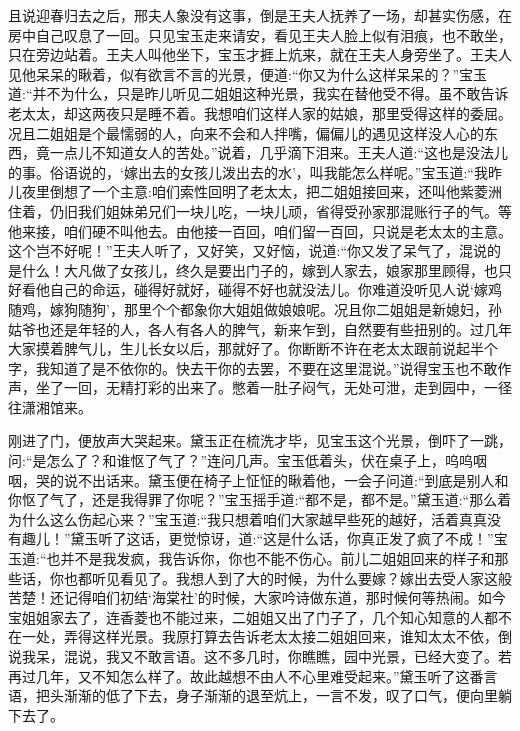 


\begin{parag}
    且说迎春归去之后，邢夫人象没有这事，倒是王夫人抚养了一场，却甚实伤感，在房中自己叹息了一回。只见宝玉走来请安，看见王夫人脸上似有泪痕，也不敢坐，只在旁边站着。王夫人叫他坐下，宝玉才捱上炕来，就在王夫人身旁坐了。王夫人见他呆呆的瞅着，似有欲言不言的光景，便道:“你又为什么这样呆呆的？”宝玉道:“并不为什么，只是昨儿听见二姐姐这种光景，我实在替他受不得。虽不敢告诉老太太，却这两夜只是睡不着。我想咱们这样人家的姑娘，那里受得这样的委屈。况且二姐姐是个最懦弱的人，向来不会和人拌嘴，偏偏儿的遇见这样没人心的东西，竟一点儿不知道女人的苦处。”说着，几乎滴下泪来。王夫人道:“这也是没法儿的事。俗语说的，‘嫁出去的女孩儿泼出去的水’，叫我能怎么样呢。”宝玉道:“我昨儿夜里倒想了一个主意:咱们索性回明了老太太，把二姐姐接回来，还叫他紫菱洲住着，仍旧我们姐妹弟兄们一块儿吃，一块儿顽，省得受孙家那混账行子的气。等他来接，咱们硬不叫他去。由他接一百回，咱们留一百回，只说是老太太的主意。这个岂不好呢！”王夫人听了，又好笑，又好恼，说道:“你又发了呆气了，混说的是什么！大凡做了女孩儿，终久是要出门子的，嫁到人家去，娘家那里顾得，也只好看他自己的命运，碰得好就好，碰得不好也就没法儿。你难道没听见人说‘嫁鸡随鸡，嫁狗随狗’，那里个个都象你大姐姐做娘娘呢。况且你二姐姐是新媳妇，孙姑爷也还是年轻的人，各人有各人的脾气，新来乍到，自然要有些扭别的。过几年大家摸着脾气儿，生儿长女以后，那就好了。你断断不许在老太太跟前说起半个字，我知道了是不依你的。快去干你的去罢，不要在这里混说。”说得宝玉也不敢作声，坐了一回，无精打彩的出来了。憋着一肚子闷气，无处可泄，走到园中，一径往潇湘馆来。
\end{parag}


\begin{parag}
    刚进了门，便放声大哭起来。黛玉正在梳洗才毕，见宝玉这个光景，倒吓了一跳，问:“是怎么了？和谁怄了气了？”连问几声。宝玉低着头，伏在桌子上，呜呜咽咽，哭的说不出话来。黛玉便在椅子上怔怔的瞅着他，一会子问道:“到底是别人和你怄了气了，还是我得罪了你呢？”宝玉摇手道:“都不是，都不是。”黛玉道:“那么着为什么这么伤起心来？”宝玉道:“我只想着咱们大家越早些死的越好，活着真真没有趣儿！”黛玉听了这话，更觉惊讶，道:“这是什么话，你真正发了疯了不成！”宝玉道:“也并不是我发疯，我告诉你，你也不能不伤心。前儿二姐姐回来的样子和那些话，你也都听见看见了。我想人到了大的时候，为什么要嫁？嫁出去受人家这般苦楚！还记得咱们初结‘海棠社’的时候，大家吟诗做东道，那时候何等热闹。如今宝姐姐家去了，连香菱也不能过来，二姐姐又出了门子了，几个知心知意的人都不在一处，弄得这样光景。我原打算去告诉老太太接二姐姐回来，谁知太太不依，倒说我呆，混说，我又不敢言语。这不多几时，你瞧瞧，园中光景，已经大变了。若再过几年，又不知怎么样了。故此越想不由人不心里难受起来。”黛玉听了这番言语，把头渐渐的低了下去，身子渐渐的退至炕上，一言不发，叹了口气，便向里躺下去了。
\end{parag}


